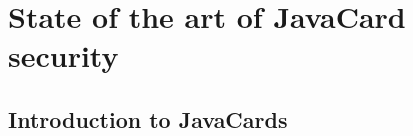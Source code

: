 \chapter{State of the art of JavaCard security}\label{chp:state-of-the-art}




\section{Introduction to JavaCards}
    









    

